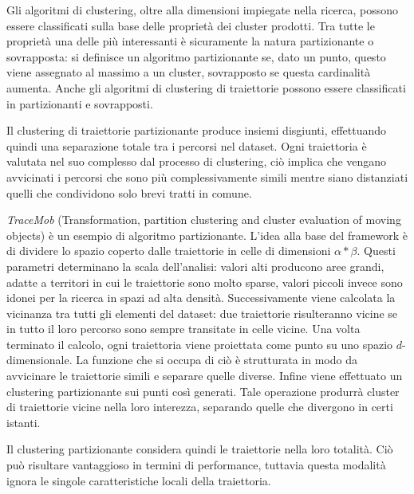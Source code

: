 Gli algoritmi di clustering, oltre alla dimensioni impiegate nella ricerca, possono 
essere classificati sulla base delle proprietà dei cluster prodotti.
Tra tutte le proprietà una delle più interessanti è sicuramente la natura partizionante o sovrapposta:
si definisce un algoritmo partizionante se, dato un punto, questo viene assegnato al massimo a un cluster,
sovrapposto se questa cardinalità aumenta.
Anche gli algoritmi di clustering di traiettorie possono essere classificati in partizionanti e sovrapposti.

Il clustering di traiettorie partizionante produce insiemi disgiunti, effettuando quindi una separazione 
totale tra i percorsi nel dataset.
Ogni traiettoria è valutata nel suo complesso dal processo di clustering, ciò implica che vengano avvicinati
i percorsi che sono più complessivamente simili mentre siano distanziati quelli che condividono solo brevi tratti in comune.

\textit{TraceMob} (Transformation, partition clustering and cluster evaluation of moving objects) è un esempio di algoritmo partizionante.
L'idea alla base del framework è di dividere lo spazio coperto dalle traiettorie in celle di dimensioni 
\(\alpha * \beta\). 
Questi parametri determinano la scala dell'analisi: valori alti producono aree grandi, adatte a territori in cui le traiettorie sono molto sparse, valori piccoli invece sono idonei per la ricerca in spazi ad alta densità.
Successivamente viene calcolata la vicinanza tra tutti gli elementi del dataset: due traiettorie risulteranno vicine se in tutto il loro percorso sono sempre transitate in celle vicine.
Una volta terminato il calcolo, ogni traiettoria viene proiettata come punto su uno spazio \(d\)-dimensionale.
La funzione che si occupa di ciò è strutturata in modo da avvicinare le traiettorie simili e separare quelle diverse.
Infine viene effettuato un clustering partizionante sui punti così generati. 
Tale operazione produrrà cluster di traiettorie vicine nella loro interezza, separando quelle che 
divergono in certi istanti.

Il clustering partizionante considera quindi le traiettorie nella loro totalità.
Ciò può risultare vantaggioso in termini di performance, tuttavia questa modalità 
ignora le singole caratteristiche locali della traiettoria.

